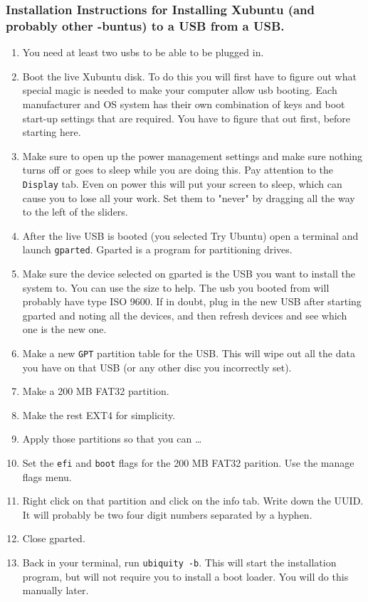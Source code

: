 \documentclass{article}
\begin{document}
\subsubsection{Installation Instructions for Installing Xubuntu (and probably other -buntus) to a USB from a USB.}
\label{sec:org387a9b6}
\begin{enumerate}
\item You need at least two usbs to be able to be plugged in.
\item Boot the live Xubuntu disk. To do this you will first have to figure out what special magic is needed to make your computer allow usb booting. Each manufacturer and OS system has their own combination of keys and boot start-up settings that are required. You have to figure that out first, before starting here.
\item Make sure to open up the power management settings and make sure nothing turns off or goes to sleep while you are doing this. Pay attention to the \texttt{Display} tab. Even on power this will put your screen to sleep, which can cause you to lose all your work. Set them to "never" by dragging all the way to the left of the sliders.
\item After the live USB is booted (you selected Try Ubuntu) open a terminal and launch \texttt{gparted}. Gparted is a program for partitioning drives.
\item Make sure the device selected on gparted is the USB you want to install the system to. You can use the size to help. The usb you  booted from will probably have type ISO 9600. If in doubt, plug in the new USB after starting gparted and noting all the devices, and then refresh devices and see which one is the new one.
\item Make a new \texttt{GPT} partition table for the USB. This will wipe out all the data you have on that USB (or any other disc you incorrectly set).
\item Make a 200 MB FAT32 partition.
\item Make the rest EXT4 for simplicity.
\item Apply those partitions so that you can \ldots{}
\item Set the \texttt{efi} and \texttt{boot} flags for the 200 MB FAT32 parition. Use the manage flags menu.
\item Right click on that partition and click on the info tab. Write down the UUID. It will probably be two four digit numbers separated by a hyphen.
\item Close gparted.
\item Back in your terminal, run \texttt{ubiquity -b}. This will start the installation program, but will not require you to install a boot loader. You will do this manually later.

\end{enumerate}
\end{document}
